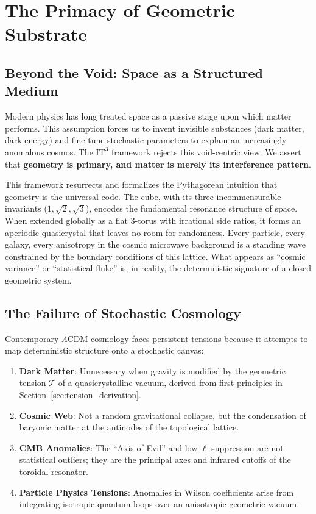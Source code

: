 \documentclass[12pt,a4paper,oneside]{article}
\theoremstyle{plain}
\theoremstyle{definition}
\theoremstyle{remark}
\newcommand{\ITthree}{\mathrm{IT}^3}
\newcommand{\tension}{\mathcal{T}}
\begin{document}
\tableofcontents
\newpage

\section{The Primacy of Geometric Substrate}
\label{sec:introduction}

\subsection{Beyond the Void: Space as a Structured Medium}
Modern physics has long treated space as a passive stage upon which matter performs. This assumption forces us to invent invisible substances (dark matter, dark energy) and fine-tune stochastic parameters to explain an increasingly anomalous cosmos. The \texorpdfstring{$\ITthree$}{IT3} framework rejects this void-centric view. We assert that \textbf{geometry is primary, and matter is merely its interference pattern}.

This framework resurrects and formalizes the Pythagorean intuition that geometry is the universal code. The cube, with its three incommensurable invariants ($1, \sqrt{2}, \sqrt{3}$), encodes the fundamental resonance structure of space. When extended globally as a flat 3-torus with irrational side ratios, it forms an aperiodic quasicrystal that leaves no room for randomness. Every particle, every galaxy, every anisotropy in the cosmic microwave background is a standing wave constrained by the boundary conditions of this lattice. What appears as ``cosmic variance'' or ``statistical fluke'' is, in reality, the deterministic signature of a closed geometric system.

\subsection{The Failure of Stochastic Cosmology}
Contemporary $\Lambda$CDM cosmology faces persistent tensions because it attempts to map deterministic structure onto a stochastic canvas:
\begin{enumerate}
    \item \textbf{Dark Matter}: Unnecessary when gravity is modified by the geometric tension $\tension$ of a quasicrystalline vacuum, derived from first principles in Section~\ref{sec:tension_derivation}.
    \item \textbf{Cosmic Web}: Not a random gravitational collapse, but the condensation of baryonic matter at the antinodes of the topological lattice.
    \item \textbf{CMB Anomalies}: The ``Axis of Evil'' and low-$\ell$ suppression are not statistical outliers; they are the principal axes and infrared cutoffs of the toroidal resonator.
    \item \textbf{Particle Physics Tensions}: Anomalies in Wilson coefficients arise from integrating isotropic quantum loops over an anisotropic geometric vacuum.
\end{enumerate}
\end{document}
